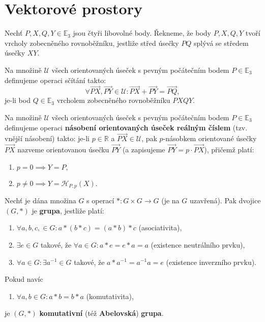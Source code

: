 \section{Vektorové prostory}
\begin{definition}
    Nechť $P, X, Q, Y\in \mathbb E_3$ jsou čtyři libovolné body. Řekneme, že body
    $P, X, Q, Y$ tvoří
    vrcholy zobecněného rovnoběžníku, jestliže střed úsečky $PQ$ splývá se středem úsečky
    $XY$.
\end{definition}

\begin{definition}
    Na množině $\mathscr U$ všech orientovaných úseček s pevným počátečním bodem
    $P\in \mathbb E_3$
    definujeme operaci sčítání takto:
    $$\forall \overrightarrow{PX}, \overrightarrow{PY} \in \mathscr U:
        \overrightarrow{PX} +  \overrightarrow{PY} = \overrightarrow{PQ},$$
    je-li bod $Q\in \mathbb E_3$
    vrcholem zobecněného rovnoběžníku $PXQY$.
\end{definition}

\begin{definition}
    Na množině $\mathscr U$ všech orientovaných úseček s pevným počátečním bodem
    $P\in \mathbb E_3$
    definujeme operaci \textbf{násobení orientovaných úseček reálným číslem}
    (tzv. vnější násobení) takto: je-li $p\in \mathbb R$ a $\overrightarrow{PX}\in \mathscr U$,
    pak $p$-násobkem orientované
    úsečky $\overrightarrow{PX}$ nazveme orientovanou úsečku $\overrightarrow{PY}$
    (a zapisujeme $\overrightarrow{PY}=p \cdot \overrightarrow{PX}$), přičemž
    platí:
    \begin{enumerate}[$i.$]
    \item $p=0 \implies Y=P,$
   	\item $p\ne 0 \implies Y = \mathscr H_{P,p}(X).$
    \end{enumerate}
\end{definition}

\begin{definition}
    Nechť je dána množina $G$ s operací $*:G\times G \to G$ (je na $G$ uzavřená).
    Pak dvojice $(G,*)$ je \textbf{grupa}, jestliže platí:
    \begin{enumerate}[$i.$]
        \item $\forall a,b,c, \in G: a*(b*c) = (a*b)*c$ (asociativita),
       	\item $\exists e \in G$ takové, že $\forall a\in G: a*e=e*a=a$ (existence neutrálního prvku),
       	\item $\forall a\in G: \exists a^{-1}\in G$ takové, že $a*a^{-1}=a^{-1}a=e$ (existence inverzního prvku).
    \end{enumerate}
    Pokud navíc
    \begin{enumerate}[$iv.$]
        \item $\forall a,b \in G: a*b=b*a$ (komutativita),
    \end{enumerate}
    je $(G,*)$ \textbf{komutativní} (též \textbf{Abelovská}) \textbf{grupa}.
\end{definition}

